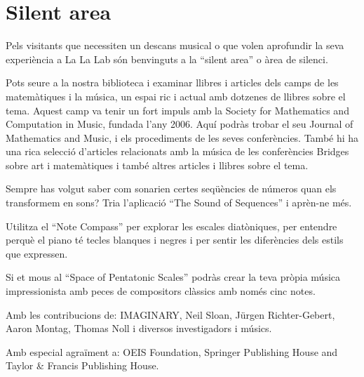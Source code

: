 \section{Silent area}
Pels visitants que necessiten un descans musical o que volen aprofundir la seva experiència a La La Lab són benvinguts a la ``silent area'' o àrea de silenci.

Pots seure a la nostra biblioteca i examinar llibres i articles dels camps de les matemàtiques i la música, un espai ric i actual amb dotzenes de llibres sobre el tema. Aquest camp va tenir un fort impuls amb la Society for Mathematics and Computation in Music, fundada l'any 2006. Aquí podràs trobar el seu Journal of Mathematics and Music, i els procediments de les seves conferències. També hi ha una rica selecció d'articles relacionats amb la música de les conferències Bridges sobre art i matemàtiques i també altres articles i llibres sobre el tema.  

Sempre has volgut saber com sonarien certes seqüències de números quan els transformem en sons? Tria l'aplicació ``The Sound of Sequences'' i aprèn-ne més.

Utilitza el ``Note Compass'' per explorar les escales diatòniques, per entendre perquè el piano té tecles blanques i negres i per sentir les diferències dels estils que expressen.

Si et mous al ``Space of Pentatonic Scales'' podràs crear la teva pròpia música impressionista amb peces de compositors clàssics amb només cinc notes.

\begin{sectcredits}
\item[Amb les contribucions de:] IMAGINARY, Neil Sloan, Jürgen Richter-Gebert, Aaron Montag, Thomas Noll i diversos investigadors i músics. 
\item[Amb especial agraïment a:] OEIS Foundation, Springer Publishing House and Taylor \& Francis Publishing House.
\end{sectcredits}
